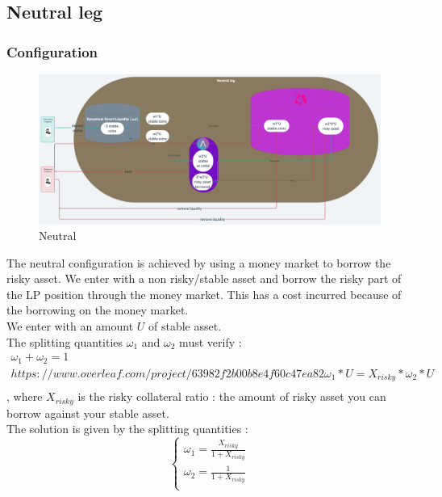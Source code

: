 \documentclass[conference]{IEEEtran}
\begin{document}
\subsection{Neutral leg}
\subsubsection{Configuration}
\begin{figure}[h!]
    \centering
    \includegraphics[scale=0.07]{Plots/neutral_leg.png}
    \caption{Neutral}
    \label{fig:neutral_leg}
\end{figure}
The neutral configuration is achieved by using a money market to borrow the risky asset. We enter with a non risky/stable asset and borrow the risky part of the LP position through the money market. This has a cost incurred because of the borrowing on the money market.\\
We enter with an amount $U$ of stable asset.\\
The splitting quantities $\omega_1$ and $\omega_2$ must verify : 
\begin{equation}
\begin{array}{ll}
\omega_1 + \omega_2 = 1\\https://www.overleaf.com/project/63982f2b00b8e4f60c47ea82
\omega_1 * U = X_{risky}*\omega_2 * U\\    
\end{array}
\end{equation}
, where $X_{risky}$ is the risky collateral ratio : the amount of risky asset you can borrow against your stable asset.\\
The solution is given by the splitting quantities :
\begin{equation}
\left\{
\begin{array}{ll}
\omega_1  = \frac{X_{risky}}{1+X_{risky}}\\
\omega_2  = \frac{1}{1+X_{risky}}\\
\end{array}\right.
\end{equation}
\end{document}
